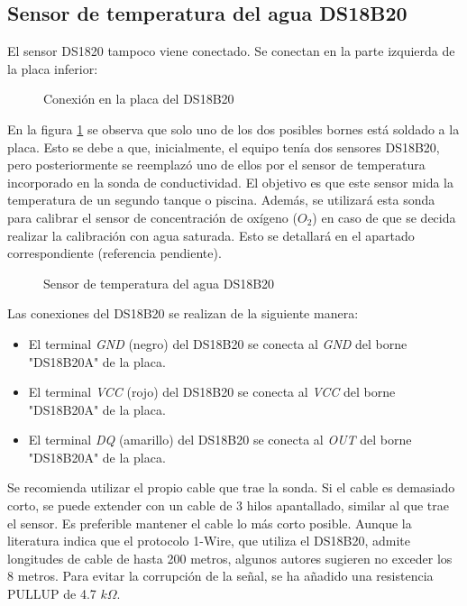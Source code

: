 \subsection{Sensor de temperatura del agua DS18B20}

El sensor DS1820 tampoco viene conectado. Se conectan en la parte izquierda de la placa inferior:

\begin{figure}[htbp!]
\caption{Conexión en la placa del DS18B20}\label{placa:acuacol:ds18b20}
\end{figure}

En la figura \ref{placa:acuacol:ds18b20} se observa que solo uno de los dos posibles bornes está soldado a la placa. Esto se debe a que, inicialmente, el equipo tenía dos sensores DS18B20, pero posteriormente se reemplazó uno de ellos por el sensor de temperatura incorporado en la sonda de conductividad. El objetivo es que este sensor mida la temperatura de un segundo tanque o piscina. Además, se utilizará esta sonda para calibrar el sensor de concentración de oxígeno ($O_2$) en caso de que se decida realizar la calibración con agua saturada. Esto se detallará en el apartado correspondiente (referencia pendiente).

\begin{figure}[htbp!] 
\caption{Sensor de temperatura del agua DS18B20}\label{sensor:ds18b20} 
\end{figure}

Las conexiones del DS18B20 se realizan de la siguiente manera:

\begin{itemize} 
\item El terminal \emph{GND} (negro) del DS18B20 se conecta al \emph{GND} del borne "DS18B20A" de la placa. 
\item El terminal \emph{VCC} (rojo) del DS18B20 se conecta al \emph{VCC} del borne "DS18B20A" de la placa. 
\item El terminal \emph{DQ} (amarillo) del DS18B20 se conecta al \emph{OUT} del borne "DS18B20A" de la placa. 
\end{itemize}

Se recomienda utilizar el propio cable que trae la sonda. Si el cable es demasiado corto, se puede extender con un cable de 3 hilos apantallado, similar al que trae el sensor. Es preferible mantener el cable lo más corto posible. Aunque la literatura indica que el protocolo 1-Wire, que utiliza el DS18B20, admite longitudes de cable de hasta 200 metros, algunos autores sugieren no exceder los 8 metros. Para evitar la corrupción de la señal, se ha añadido una resistencia PULLUP de 4.7 $k\Omega$.

